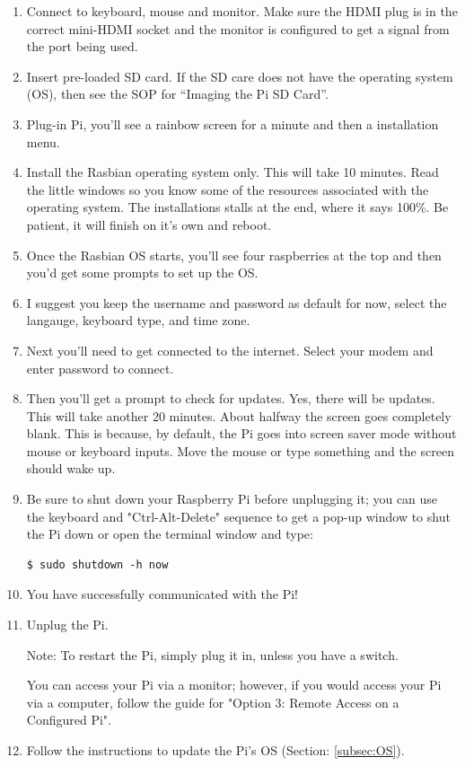 \documentclass{article}\usepackage[]{graphicx}\usepackage[]{color}
\begin{document}
\begin{enumerate}

\item Connect to keyboard, mouse and monitor. Make sure the HDMI plug is in the correct mini-HDMI socket and the monitor is configured to get a signal from the port being used. 

\item Insert pre-loaded SD card. If the SD care does not have the operating system (OS), then see the SOP for ``Imaging the Pi SD Card''. 

\item Plug-in Pi, you'll see a rainbow screen for a minute and then a installation menu. 

\item Install the Rasbian operating system only. This will take 10 minutes. Read the little windows so you know some of the resources associated with the operating system. The installations stalls at the end, where it says 100\%. Be patient, it will finish on it's own and reboot.

\item Once the Rasbian OS starts, you'll see four raspberries at the top and then you'd get some prompts to set up the OS. 

\item I suggest you keep the username and password as default for now, select the langauge, keyboard type, and time zone. 

\item Next you'll need to get connected to the internet. Select your modem and enter password to connect.

\item Then you'll get a prompt to check for updates. Yes, there will be updates. This will take another 20 minutes. About halfway the screen goes completely blank. This is because, by default, the Pi goes into screen saver mode without mouse or keyboard inputs. Move the mouse or type something and the screen should wake up. 

\item Be sure to shut down your Raspberry Pi before unplugging it; you can use the keyboard and "Ctrl-Alt-Delete" sequence to get a pop-up window to shut the Pi down or open the terminal window and type:

\begin{lstlisting}
$ sudo shutdown -h now
\end{lstlisting}

\item You have successfully communicated with the Pi!  

\item Unplug the Pi.

Note: To restart the Pi, simply plug it in, unless you have a switch.

You can access your Pi via a monitor; however, if you would access your Pi via a computer, follow the guide for "Option 3: Remote Access on a Configured Pi". 

\item Follow the instructions to update the Pi's OS (Section: \ref{subsec:OS}).

\end{enumerate}
\end{document}
